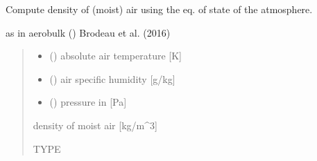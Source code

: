 \documentclass[letterpaper,10pt,english]{sphinxmanual}
\begin{document}
\begin{fulllineitems}
\label{\detokenize{users_guide:AirSeaFluxCode.util_subs.rho_air}}
\pysigstartsignatures
{}
\pysigstopsignatures
\sphinxAtStartPar
Compute density of (moist) air using the eq. of state of the atmosphere.

\sphinxAtStartPar
as in aerobulk () Brodeau et al. (2016)
\begin{quote}\begin{description}
\begin{itemize}
\item {} 
\sphinxAtStartPar
{} () \textendash{} absolute air temperature             {[}K{]}

\item {} 
\sphinxAtStartPar
{} () \textendash{} air specific humidity   {[}g/kg{]}

\item {} 
\sphinxAtStartPar
{} () \textendash{} pressure in                {[}Pa{]}

\end{itemize}

\sphinxAtStartPar
{} \textendash{} density of moist air   {[}kg/m\textasciicircum{}3{]}

\sphinxAtStartPar
TYPE

\end{description}\end{quote}

\end{fulllineitems}

\end{document}
